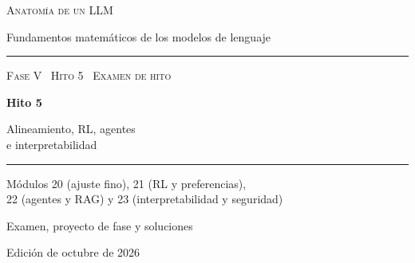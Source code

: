 \documentclass[11pt,a4paper,twoside,openany]{book}
\renewcommand{\thechapter}{\Alph{chapter}}
\begin{document}
\frontmatter
\begin{titlepage}
\centering
\vspace*{2.5cm}
{\large\scshape Anatomía de un LLM}\par
\vspace{0.4cm}
{\normalsize Fundamentos matemáticos de los modelos de lenguaje}\par
\vspace{2.2cm}
\rule{\textwidth}{0.8pt}\par\vspace{0.5cm}
{\small\scshape Fase V \textperiodcentered\ Hito 5 \textperiodcentered\ Examen de hito}\par\vspace{0.3cm}
{\Huge\bfseries Hito 5\par}\vspace{0.3cm}
{\LARGE Alineamiento, RL, agentes\\[2pt] e interpretabilidad\par}
\vspace{0.5cm}\rule{\textwidth}{0.4pt}\par
\vspace{1.0cm}
{\normalsize Módulos 20 (ajuste fino), 21 (RL y preferencias),\\ 22 (agentes y RAG) y 23 (interpretabilidad y seguridad)\par}
\vspace{1.4cm}
{\large Examen, proyecto de fase y soluciones}\par
\vfill
{\small Edición de octubre de 2026}\par
\end{titlepage}



\tableofcontents

\mainmatter




\appendix
\renewcommand{\thechapter}{\Roman{chapter}}



\backmatter

\end{document}
